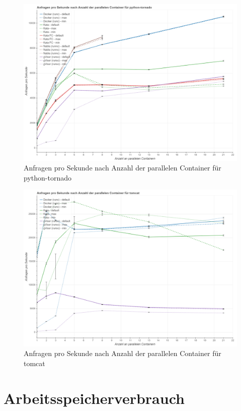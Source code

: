 \begin{figure}[h]
	\centering
	\includegraphics[width=0.96\linewidth]{gfx/auswertung/ab_python.png}
	\caption{Anfragen pro Sekunde nach Anzahl der parallelen Container für python-tornado} 
	\label{fig:ab_python}
\end{figure}
\newpage
\begin{figure}[h]
	\centering
	\includegraphics[width=0.96\linewidth]{gfx/auswertung/ab_tomcat.png}
	\caption{Anfragen pro Sekunde nach Anzahl der parallelen Container für tomcat} 
	\label{fig:ab_tomcat}
\end{figure}
\newpage
\section{Arbeitsspeicherverbrauch}

